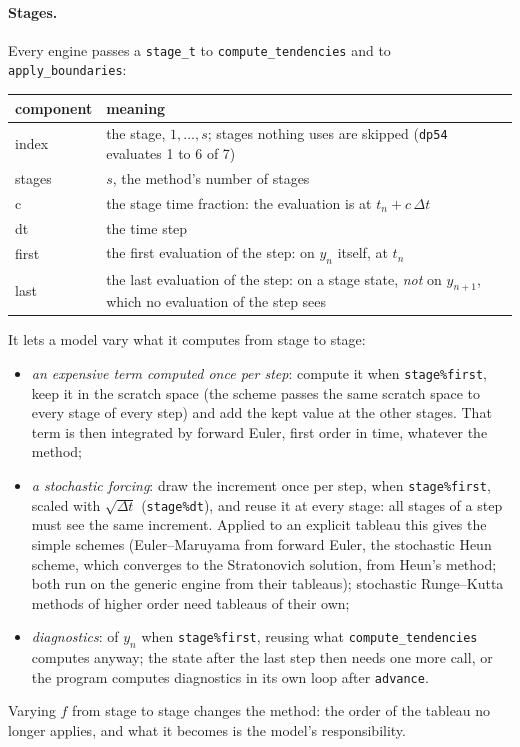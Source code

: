 \documentclass[11pt,a4paper]{article}
\newcommand{\dt}{\Delta t}
\newcommand{\code}[1]{\texttt{#1}}
\begin{document}
\paragraph{Stages.}\label{sec:stages} Every engine passes a \code{stage\_t} to
\code{compute\_tendencies} and to \code{apply\_boundaries}:
\begin{center}
\renewcommand{\arraystretch}{1.2}
\begin{tabular}{>{\ttfamily}l p{9.8cm}}
  \toprule
  \normalfont component & meaning \\
  \midrule
  index  & the stage, $1,\dots,s$; stages nothing uses are skipped
           (\code{dp54} evaluates 1 to 6 of 7) \\
  stages & $s$, the method's number of stages \\
  c      & the stage time fraction: the evaluation is at $t_n + c\,\dt$ \\
  dt     & the time step \\
  first  & the first evaluation of the step: on $y_n$ itself, at $t_n$ \\
  last   & the last evaluation of the step: on a stage state, \emph{not} on
           $y_{n+1}$, which no evaluation of the step sees \\
  \bottomrule
\end{tabular}
\end{center}
It lets a model vary what it computes from stage to stage:
\begin{itemize}
  \item \emph{an expensive term computed once per step}: compute it when
    \code{stage\%first}, keep it in the scratch space (the scheme passes the
    same scratch space to every stage of every step) and add the kept value at
    the other stages. That term is then integrated by forward Euler, first
    order in time, whatever the method;
  \item \emph{a stochastic forcing}: draw the increment once per step, when
    \code{stage\%first}, scaled with $\sqrt{\dt}$ (\code{stage\%dt}), and reuse
    it at every stage: all stages of a step must see the same increment.
    Applied to an explicit tableau this gives the simple schemes
    (Euler--Maruyama from forward Euler, the stochastic Heun scheme, which
    converges to the Stratonovich solution, from Heun's method; both run on
    the generic engine from their tableaus); stochastic Runge--Kutta methods
    of higher order need tableaus of their own;
  \item \emph{diagnostics}: of $y_n$ when \code{stage\%first}, reusing what
    \code{compute\_tendencies} computes anyway; the state after the last step
    then needs one more call, or the program computes diagnostics in its own
    loop after \code{advance}.
\end{itemize}
Varying $f$ from stage to stage changes the method: the order of the tableau
no longer applies, and what it becomes is the model's responsibility.
\end{document}
